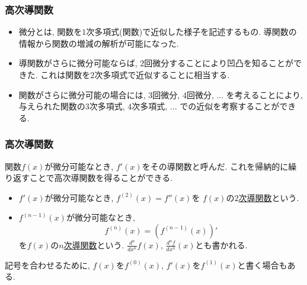 \begin{frame}
\frametitle{高次導関数}


\begin{itemize}
\item 微分とは, 関数を$1$次多項式(関数)で近似した様子を記述するもの. 
導関数の情報から関数の増減の解析が可能になった. 
\item 導関数がさらに微分可能ならば, $2$回微分することにより凹凸を知ることができた. 
これは関数を$2$次多項式で近似することに相当する.
\item 関数がさらに微分可能の場合には, $3$回微分, $4$回微分, ... を考えることにより, 
与えられた関数の$3$次多項式, $4$次多項式, ... での近似を考察することができる. 
\end{itemize}


\end{frame}








\begin{frame}
\frametitle{高次導関数}


関数$f(x)$が微分可能なとき, $f'(x)$をその導関数と呼んだ. 
これを帰納的に繰り返すことで高次導関数を得ることができる. 
\begin{Def}
\begin{itemize}
\item $f'(x)$が微分可能なとき, $f^{(2)}(x)=f''(x)$を $f(x)$の\underline{$2$次導関数}という. 
\item $f^{(n-1)}(x)$が微分可能なとき, 
$$
f^{(n)}(x)=(f^{(n-1)}(x))'
$$
を$f(x)$の\underline{$n$次導関数}という. $\frac{d^n}{dx^n}f(x)$, $\frac{d^nf}{dx^n}(x)$とも書かれる.  
\end{itemize}
\end{Def}

記号を合わせるために, $f(x)$を$f^{(0)}(x)$, $f'(x)$を$f^{(1)}(x)$と書く場合もある.  


\end{frame}







